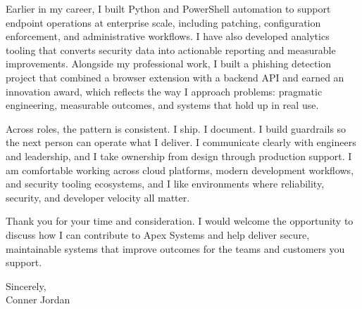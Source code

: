 \documentclass[letterpaper,11pt]{article}
\begin{document}
\vspace{16pt}

Earlier in my career, I built Python and PowerShell automation to support endpoint operations at enterprise scale, including patching, configuration enforcement, and administrative workflows. I have also developed analytics tooling that converts security data into actionable reporting and measurable improvements. Alongside my professional work, I built a phishing detection project that combined a browser extension with a backend API and earned an innovation award, which reflects the way I approach problems: pragmatic engineering, measurable outcomes, and systems that hold up in real use.

\vspace{16pt}

Across roles, the pattern is consistent. I ship. I document. I build guardrails so the next person can operate what I deliver. I communicate clearly with engineers and leadership, and I take ownership from design through production support. I am comfortable working across cloud platforms, modern development workflows, and security tooling ecosystems, and I like environments where reliability, security, and developer velocity all matter.

\vspace{16pt}

Thank you for your time and consideration. I would welcome the opportunity to discuss how I can contribute to Apex Systems and help deliver secure, maintainable systems that improve outcomes for the teams and customers you support.

\vspace{16pt}

Sincerely,\\
Conner Jordan
\end{document}
